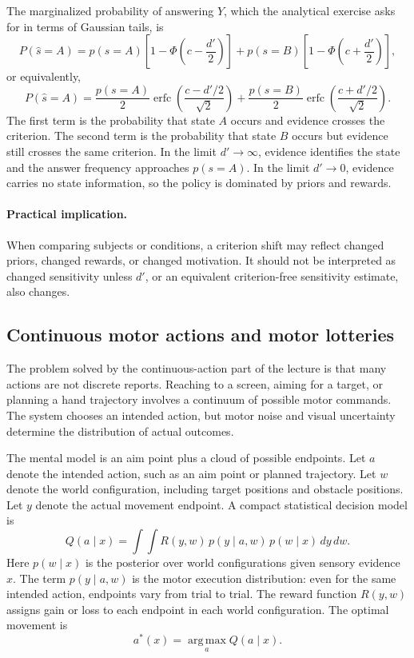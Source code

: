 The marginalized probability of answering \(Y\), which the analytical exercise asks for in terms of Gaussian tails, is
\[
  P(\hat s=A)
  =
  p(s=A)\left[1-\Phi\!\left(c-\frac{d'}{2}\right)\right]
  +
  p(s=B)\left[1-\Phi\!\left(c+\frac{d'}{2}\right)\right],
\]
or equivalently,
\[
  P(\hat s=A)
  =
  \frac{p(s=A)}{2}
  \operatorname{erfc}\!\left(\frac{c-d'/2}{\sqrt{2}}\right)
  +
  \frac{p(s=B)}{2}
  \operatorname{erfc}\!\left(\frac{c+d'/2}{\sqrt{2}}\right).
\]
The first term is the probability that state \(A\) occurs and evidence crosses the criterion. The second term is the probability that state \(B\) occurs but evidence still crosses the same criterion. In the limit \(d'\to\infty\), evidence identifies the state and the answer frequency approaches \(p(s=A)\). In the limit \(d'\to 0\), evidence carries no state information, so the policy is dominated by priors and rewards.

\paragraph{Practical implication.}
When comparing subjects or conditions, a criterion shift may reflect changed priors, changed rewards, or changed motivation. It should not be interpreted as changed sensitivity unless \(d'\), or an equivalent criterion-free sensitivity estimate, also changes.

\subsection{Continuous motor actions and motor lotteries}

The problem solved by the continuous-action part of the lecture is that many actions are not discrete reports. Reaching to a screen, aiming for a target, or planning a hand trajectory involves a continuum of possible motor commands. The system chooses an intended action, but motor noise and visual uncertainty determine the distribution of actual outcomes.

The mental model is an aim point plus a cloud of possible endpoints. Let \(a\) denote the intended action, such as an aim point or planned trajectory. Let \(w\) denote the world configuration, including target positions and obstacle positions. Let \(y\) denote the actual movement endpoint. A compact statistical decision model is
\[
  Q(a\mid x)
  =
  \int\!\!\int R(y,w)\,p(y\mid a,w)\,p(w\mid x)\,dy\,dw.
\]
Here \(p(w\mid x)\) is the posterior over world configurations given sensory evidence \(x\). The term \(p(y\mid a,w)\) is the motor execution distribution: even for the same intended action, endpoints vary from trial to trial. The reward function \(R(y,w)\) assigns gain or loss to each endpoint in each world configuration. The optimal movement is
\[
  a^*(x)
  =
  \operatorname*{arg\,max}_a Q(a\mid x).
\]

